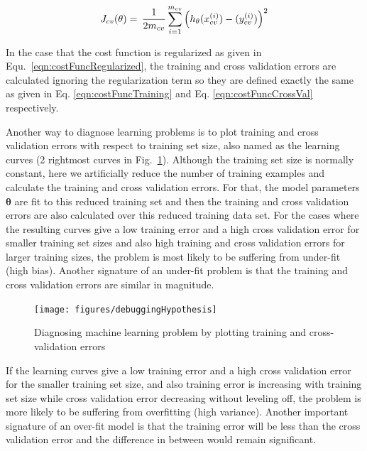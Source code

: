 \begin{equation}{\label{eqn:crossvalError}}
J_{cv}(\theta)
=\,
\frac{1}{2m_{cv}} \sum\limits_{i=1}^{m_{cv}} \Big(h_\theta(x_{cv}^{(i)}) - (y_{cv}^{(i)})\Big)^2  
\end{equation} 
\fi

In the case that the cost function is regularized as given in Equ.~\ref{eqn:costFuncRegularized}, the training and cross validation errors are calculated ignoring the regularization term so they are defined exactly the same as given in Eq. \ref{eqn:costFuncTraining} and Eq. \ref{eqn:costFuncCrossVal} respectively.


Another way to diagnose learning problems is to plot training and cross validation errors with respect to training set size, also named as the learning curves (2 rightmost curves in Fig.~\ref{fig:debuggingHypothesis}). 
Although the training set size is normally constant, here we artificially reduce the number of training examples and calculate the training and cross validation errors. 
For that, the model parameters $\bm{\theta}$ are fit to this reduced training set and then the training and cross validation errors are also calculated over this reduced training data set. 
For the cases where the resulting curves give a low training error and a high cross validation error for smaller training set sizes and also high training and cross validation errors for larger training sizes, the problem is most likely to be suffering from under-fit (high bias). 
Another signature of an under-fit problem is that the training and cross validation errors are similar in magnitude. 

\begin{landscape}
\begin{figure}
\begin{center}
\texttt{[image: figures/debuggingHypothesis]}    %
\caption{Diagnosing machine learning problem by plotting training and cross-validation errors} 
\label{fig:debuggingHypothesis}
\end{center}
\end{figure}
\end{landscape}

If the learning curves give a low training error and a high cross validation error for the smaller training set size, and also training error is increasing with training set size while cross validation error decreasing without leveling off, the problem is more likely to be suffering from overfitting (high variance). 
Another important signature of an over-fit model is that the training error will be less than the cross validation error and the difference in between would remain significant. 


